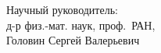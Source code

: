 \begin{frame}
    \setcounter{framenumber}{1}
    \maketitle
    \vfill
    \begin{adjustbox}{minipage=6cm, right}
        Научный руководитель:\\ д-р физ.-мат. наук, \mbox{проф. РАН}, \\
        Головин Сергей Валерьевич
    \end{adjustbox}
    \vfill
    \centering
    \insertdate\par
\end{frame}
